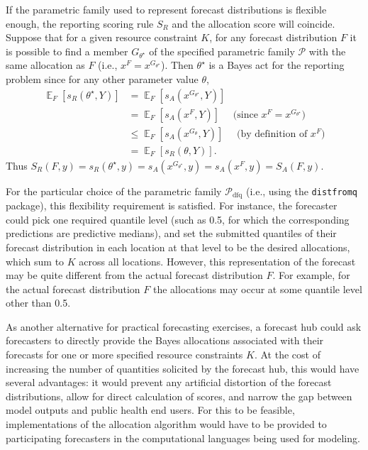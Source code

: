 \documentclass{article}\usepackage[]{graphicx}\usepackage[]{xcolor}
\DeclareMathOperator{\Ex}{\mathbb{E}}
\begin{document}
If the parametric family used to represent forecast distributions is flexible enough, the reporting scoring rule $S_R$
and the allocation score will coincide.
Suppose that for a given resource constraint $K$, for any forecast distribution $F$ it is possible to find a member
$G_{\theta^\star}$ of the specified parametric family $\mathcal{P}$ with the same allocation as $F$ (i.e., 
$x^F = x^{G_{\theta^\star}}$). Then $\theta^\star$ is a Bayes act for the reporting problem since for any other
parameter value
$\theta$,
\begin{align*}
\Ex_F[s_R(\theta^\star, Y)] &= \Ex_F[ s_A(x^{G_{\theta^\star}}, Y) ] \\
&= \Ex_F[s_A(x^F, Y)]  \quad \text{ (since $x^F = x^{G_{\theta^\star}}$)} \\
&\leq \Ex_F[ s_A(x^{G_\theta}, Y) ]  \quad \text{ (by definition of $x^F$)} \\
&= \Ex_F[ s_R(\theta, Y)].
\end{align*}
Thus $S_R(F, y) = s_R(\theta^\star, y) 
= s_A(x^{G_{\theta^\star}}, y) 
= s_A(x^F, y) 
= S_A(F, y)$.


For the particular choice of the parametric family $\mathcal{P}_{\text{dfq}}$ (i.e., using the \verb`distfromq`
package), this flexibility requirement is satisfied. For instance, the forecaster could pick one required quantile level
(such as 0.5, for which the corresponding predictions are predictive medians), and set the submitted quantiles of their
forecast distribution in each location at that level to be the desired allocations, which sum to $K$ across all
locations. However, this representation of the forecast may be quite different from the actual forecast distribution
$F$. For example, for the actual forecast distribution $F$ the allocations may occur at some quantile level other than
0.5.

As another alternative for practical forecasting exercises, a forecast hub could ask forecasters to directly provide the
Bayes allocations associated with their forecasts for one or more specified resource constraints $K$. At the cost of
increasing the number of quantities solicited by the forecast hub, this would have several advantages: it would prevent
any artificial distortion of the forecast distributions, allow for direct calculation of scores, and narrow the gap
between model outputs and public health end users. For this to be feasible, implementations of the allocation algorithm
would have to be provided to participating forecasters in the computational languages being used for modeling.
\end{document}
